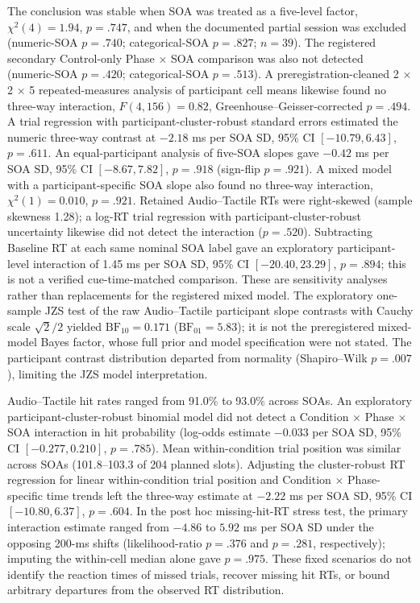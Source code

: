The conclusion was stable when SOA was treated as a five-level factor, $\chi^{2}(4)=1.94$, $p=.747$, and when the documented partial session was excluded (numeric-SOA $p=.740$; categorical-SOA $p=.827$; $n=39$). The registered secondary Control-only Phase $\times$ SOA comparison was also not detected (numeric-SOA $p=.420$; categorical-SOA $p=.513$). A preregistration-cleaned 2 $\times$ 2 $\times$ 5 repeated-measures analysis of participant cell means likewise found no three-way interaction, $F(4,156)=0.82$, Greenhouse--Geisser-corrected $p=.494$. A trial regression with participant-cluster-robust standard errors estimated the numeric three-way contrast at $-2.18$ ms per SOA SD, 95\% CI $[-10.79, 6.43]$, $p=.611$. An equal-participant analysis of five-SOA slopes gave $-0.42$ ms per SOA SD, 95\% CI $[-8.67, 7.82]$, $p=.918$ (sign-flip $p=.921$). A mixed model with a participant-specific SOA slope also found no three-way interaction, $\chi^{2}(1)=0.010$, $p=.921$. Retained Audio--Tactile RTs were right-skewed (sample skewness 1.28); a log-RT trial regression with participant-cluster-robust uncertainty likewise did not detect the interaction ($p=.520$). Subtracting Baseline RT at each same nominal SOA label gave an exploratory participant-level interaction of 1.45 ms per SOA SD, 95\% CI $[-20.40, 23.29]$, $p=.894$; this is not a verified cue-time-matched comparison. These are sensitivity analyses rather than replacements for the registered mixed model. The exploratory one-sample JZS test of the raw Audio--Tactile participant slope contrasts with Cauchy scale $\sqrt{2}/2$ yielded $\mathrm{BF}_{10}=0.171$ ($\mathrm{BF}_{01}=5.83$); it is not the preregistered mixed-model Bayes factor, whose full prior and model specification were not stated. The participant contrast distribution departed from normality (Shapiro--Wilk $p=.007$), limiting the JZS model interpretation.

Audio--Tactile hit rates ranged from 91.0\% to 93.0\% across SOAs. An exploratory participant-cluster-robust binomial model did not detect a Condition $\times$ Phase $\times$ SOA interaction in hit probability (log-odds estimate $-0.033$ per SOA SD, 95\% CI $[-0.277, 0.210]$, $p=.785$). Mean within-condition trial position was similar across SOAs (101.8--103.3 of 204 planned slots). Adjusting the cluster-robust RT regression for linear within-condition trial position and Condition $\times$ Phase-specific time trends left the three-way estimate at $-2.22$ ms per SOA SD, 95\% CI $[-10.80, 6.37]$, $p=.604$. In the post hoc missing-hit-RT stress test, the primary interaction estimate ranged from $-4.86$ to $5.92$ ms per SOA SD under the opposing 200-ms shifts (likelihood-ratio $p=.376$ and $p=.281$, respectively); imputing the within-cell median alone gave $p=.975$. These fixed scenarios do not identify the reaction times of missed trials, recover missing hit RTs, or bound arbitrary departures from the observed RT distribution.

